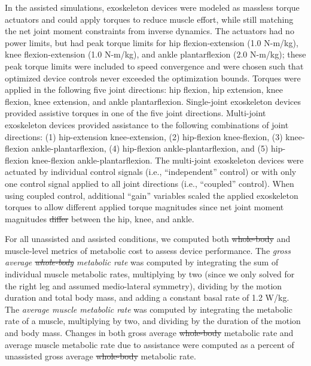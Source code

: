 \documentclass[10pt,letterpaper]{article}
\providecommand{\DIFaddtex}[1]{{\protect\color{blue}{#1}}} %
\providecommand{\DIFdeltex}[1]{{\protect\color{red}\sout{#1}}}                      %
\providecommand{\DIFaddbegin}{} %
\providecommand{\DIFaddend}{} %
\providecommand{\DIFdelbegin}{} %
\providecommand{\DIFdelend}{} %
\providecommand{\DIFadd}[1]{\texorpdfstring{\DIFaddtex{#1}}{#1}} %
\providecommand{\DIFdel}[1]{\texorpdfstring{\DIFdeltex{#1}}{}} %
\newcommand{\DIFscaledelfig}{0.5}
\newlength{\DIFdelgraphicswidth} %
\newlength{\DIFdelgraphicsheight} %
\newcommand{\DIFaddincludegraphics}[2][]{{\color{blue}\fbox{\DIFOincludegraphics[#1]{#2}}}} %
\newcommand{\DIFdelincludegraphics}[2][]{%
\sbox{\DIFdelgraphicsbox}{\DIFOincludegraphics[#1]{#2}}%
\settoboxwidth{\DIFdelgraphicswidth}{\DIFdelgraphicsbox} %
\settoboxtotalheight{\DIFdelgraphicsheight}{\DIFdelgraphicsbox} %
\scalebox{\DIFscaledelfig}{%
\parbox[b]{\DIFdelgraphicswidth}{\usebox{\DIFdelgraphicsbox}\\[-\baselineskip] \rule{\DIFdelgraphicswidth}{0em}}\llap{\resizebox{\DIFdelgraphicswidth}{\DIFdelgraphicsheight}{%
\setlength{\unitlength}{\DIFdelgraphicswidth}%
\begin{picture}(1,1)%
\thicklines\linethickness{2pt} %
{\color[rgb]{1,0,0}\put(0,0){\framebox(1,1){}}}%
{\color[rgb]{1,0,0}\put(0,0){\line( 1,1){1}}}%
{\color[rgb]{1,0,0}\put(0,1){\line(1,-1){1}}}%
\end{picture}%
}*{3pt}}} %
} %
\DeclareRobustCommand{\DIFaddbegin}{\DIFOaddbegin \let\includegraphics\DIFaddincludegraphics} %
\DeclareRobustCommand{\DIFaddend}{\DIFOaddend \let\includegraphics\DIFOincludegraphics} %
\DeclareRobustCommand{\DIFdelbegin}{\DIFOdelbegin \let\includegraphics\DIFdelincludegraphics} %
\DeclareRobustCommand{\DIFdelend}{\DIFOaddend \let\includegraphics\DIFOincludegraphics} %
\begin{document}
In the assisted simulations, exoskeleton devices were modeled as massless torque actuators and could apply torques to reduce muscle effort, while still matching the net joint moment constraints from inverse dynamics. The actuators had no power limits, but had peak torque limits for hip flexion-extension (1.0 N-m/kg), knee flexion-extension (1.0 N-m/kg), and ankle plantarflexion (2.0 N-m/kg); these peak torque limits were included to speed convergence and were chosen such that optimized device controls never exceeded the optimization bounds. Torques were applied in the following five joint directions: hip flexion, hip extension, knee flexion, knee extension, and ankle plantarflexion. Single-joint exoskeleton devices provided assistive torques in one of the five joint directions. Multi-joint exoskeleton devices provided assistance to the following combinations of joint directions: (1) hip-extension knee-extension, (2) hip-flexion knee-flexion, (3) knee-flexion ankle-plantarflexion, (4) hip-flexion ankle-plantarflexion, and (5) hip-flexion knee-flexion ankle-plantarflexion. The multi-joint exoskeleton devices were actuated by individual control signals (i.e., ``independent'' control) or with only one control signal applied to all joint directions (i.e., ``coupled'' control). When using coupled control, additional ``gain'' variables scaled the applied exoskeleton torques to allow different applied torque magnitudes since net joint moment magnitudes \DIFdelbegin \DIFdel{differ }\DIFdelend \DIFaddbegin \DIFadd{differed }\DIFaddend between the hip, knee, and ankle.

For all unassisted and assisted conditions, we computed both \DIFdelbegin \DIFdel{whole-body }\DIFdelend \DIFaddbegin \DIFadd{total }\DIFaddend and muscle-level metrics of metabolic cost to assess device performance. The \textit{gross average \DIFdelbegin \DIFdel{whole-body }\DIFdelend \DIFaddbegin \DIFadd{total }\DIFaddend metabolic rate} was computed by integrating the sum of individual muscle metabolic rates, multiplying by two (since we only solved for the right leg and assumed medio-lateral symmetry), dividing by the motion duration and total body mass, and adding a constant basal rate of 1.2 W/kg\DIFaddbegin \DIFadd{~\mbox{%
\cite{Umberger:2003}}\hspace{0pt}%
}\DIFaddend . The \textit{average muscle metabolic rate} was computed by integrating the metabolic rate of a muscle, multiplying by two, and dividing by the duration of the motion and body mass. Changes in both gross average \DIFdelbegin \DIFdel{whole-body }\DIFdelend \DIFaddbegin \DIFadd{total }\DIFaddend metabolic rate and average muscle metabolic rate due to assistance were computed as a percent of unassisted gross average \DIFdelbegin \DIFdel{whole-body }\DIFdelend \DIFaddbegin \DIFadd{total }\DIFaddend metabolic rate.
\end{document}
